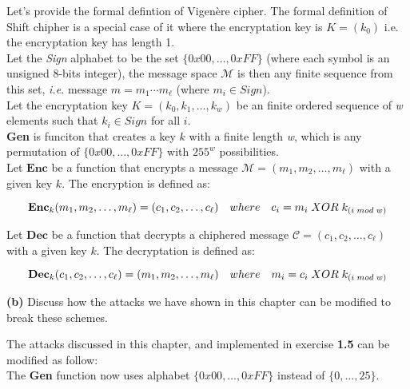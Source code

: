 Let's provide the formal defintion of Vigenère cipher. The formal definition of Shift chipher is a special case of it where the encryptation key is  \( K = (k_0)\) i.e. the encryptation key has length 1.\\

Let the \textit{Sign} alphabet to  be the set \(\{0x00, \dots, 0xFF\}\) (where each symbol is an unsigned 8-bits integer), the message space 
\( \mathcal{M} \) is then any finite sequence from this set, \textit{i.e.} message \( m = m_1 \cdots m_\ell \) (where \( m_i \in Sign \)).\\

Let the encryptation key \( K = (k_0, k_1, \dots, k_{w}) \) be an finite ordered sequence of \textit{w} elements such that \( k_i \in Sign \) for all \( i \).\\

\textbf{Gen} is funciton that creates a key \( k \) with a finite length \textit{w}, which is any permutation of \( \{0x00, \dots, 0xFF\} \) with \( 255^w \) possibilities.\\

Let \(\textbf{Enc}\) be a function that encrypts a message \( \mathcal{M} = (m_1, m_2, \dots, m_\ell) \) with a given key \( k \). The encryption is defined as:

\[
\textbf{Enc\( _k\)}(m_1, m_2, \dots, m_\ell) = (c_1, c_2, \dots, c_\ell) \quad where \quad c_i = m_i \; XOR \; k_{(i \; mod \; w)}
\]

Let \(\textbf{Dec}\) be a function that decrypts a chiphered message \( \mathcal{C} = (c_1, c_2, \dots, c_\ell) \) with a given key \( k \). The decryptation is defined as:

\[
\textbf{Dec\( _k\)}(c_1, c_2, \dots, c_\ell) = (m_1, m_2, \dots, m_\ell) \quad where \quad m_i = c_i \; XOR \; k_{(i \; mod \; w)}
\]


\vspace{1em}
\noindent
\hspace*{0.0em}\parbox[t]{\dimexpr\linewidth-3.0em}{
	\textbf{(b)} Discuss how the attacks we have shown in this chapter can be
	modified to break these schemes.
}
\vspace{1em}

The attacks discussed in this chapter, and implemented in exercise \textbf{1.5} can be modified as follow:\\

The \textbf{Gen} function now uses alphabet \(\{0x00, \dots, 0xFF\}\) instead of \(\{0, \dots, 25\}\).\\

